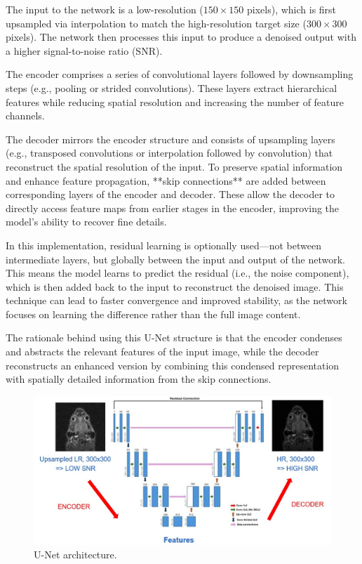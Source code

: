 \documentclass[twocolumn]{article}
\begin{document}
The input to the network is a low-resolution ($150 \times 150$ pixels), which is first upsampled via interpolation to match the high-resolution target size ($300 \times 300$ pixels). 
The network then processes this input to produce a denoised output with a higher signal-to-noise ratio (SNR).

The encoder comprises a series of convolutional layers followed by downsampling steps (e.g., pooling or strided convolutions). 
These layers extract hierarchical features while reducing spatial resolution and increasing the number of feature channels.

The decoder mirrors the encoder structure and consists of upsampling layers (e.g., transposed convolutions or interpolation followed by convolution) that reconstruct the spatial resolution of the input. 
To preserve spatial information and enhance feature propagation, **skip connections** are added between corresponding layers of the encoder and decoder. 
These allow the decoder to directly access feature maps from earlier stages in the encoder, improving the model’s ability to recover fine details.

In this implementation, residual learning is optionally used—not between intermediate layers, but globally between the input and output of the network. 
This means the model learns to predict the residual (i.e., the noise component), which is then added back to the input to reconstruct the denoised image.
This technique can lead to faster convergence and improved stability, as the network focuses on learning the difference rather than the full image content.

The rationale behind using this U-Net structure is that the encoder condenses and abstracts the relevant features of the input image, while the decoder reconstructs an enhanced version by combining this condensed representation with spatially detailed information from the skip connections.

\begin{figure}
    \centering
    \includegraphics[width=0.8\linewidth]{U-Net.jpg}
    \caption{U-Net architecture.}
    \label{fig:U-Net}
\end{figure}
\end{document}
